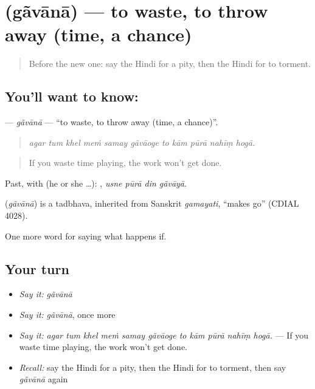 \section[\texorpdfstring{\hi{गँवाना} (gãvānā)}{गँवाना (gãvānā)}]{ (gãvānā) — to waste, to throw away (time, a chance)}

\label{lesson:HI-C381-gavana}



\begin{quote}
Before the new one: say the Hindi for a pity, then the Hindi for to torment.
\end{quote}

\subsection*{You'll want to know: }
\textbf{} — \emph{gãvānā} — \textquotedblleft{}to waste, to throw away (time, a chance)\textquotedblright{}.

\begin{quote}
          
\end{quote}

\begin{quote}
\emph{agar tum khel meṁ samay gãvāoge to kām pūrā nahīṃ hogā.}
\end{quote}

\begin{quote}
If you waste time playing, the work won't get done.
\end{quote}

Past, with  (he or she …):    , \emph{usne pūrā din gãvāyā}.

\begin{cousinweb}
\textbf{} (\emph{gãvānā}) is a tadbhava, inherited from Sanskrit \emph{gamayati}, \textquotedblleft{}makes go\textquotedblright{} (CDIAL 4028).
\end{cousinweb}

\begin{grammarlens}[title={What you've built}]
One more word for saying what happens if.
\end{grammarlens}

\subsection*{Your turn}
\begin{itemize}
\raggedright
  \item \emph{Say it:} \emph{gãvānā}
  \item \emph{Say it:} \emph{gãvānā}, once more
  \item \emph{Say it:} \emph{agar tum khel meṁ samay gãvāoge to kām pūrā nahīṃ hogā.} — If you waste time playing, the work won't get done.
  \item \emph{Recall:} say the Hindi for a pity, then the Hindi for to torment, then say \emph{gãvānā} again
\end{itemize}

